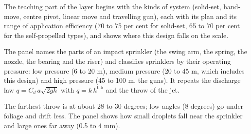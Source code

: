 
The teaching part of the layer begins with the kinds of system (solid-set, hand-move, centre pivot, linear move and travelling gun), each with its plan and its range of application efficiency (70 to 75 per cent for solid-set, 65 to 70 per cent for the self-propelled types), and shows where this design falls on the scale.


The panel names the parts of an impact sprinkler (the swing arm, the spring, the nozzle, the bearing and the riser) and classifies sprinklers by their operating pressure: low pressure (6 to 20 m), medium pressure (20 to 45 m, which includes this design) and high pressure (45 to 100 m, the guns). It repeats the discharge law $q=C_d\,a\sqrt{2gh}$ with $q=k\,h^{0.5}$ and the throw of the jet.


The farthest throw is at about 28 to 30 degrees; low angles (8 degrees) go under foliage and drift less. The panel shows how small droplets fall near the sprinkler and large ones far away (0.5 to 4 mm).


